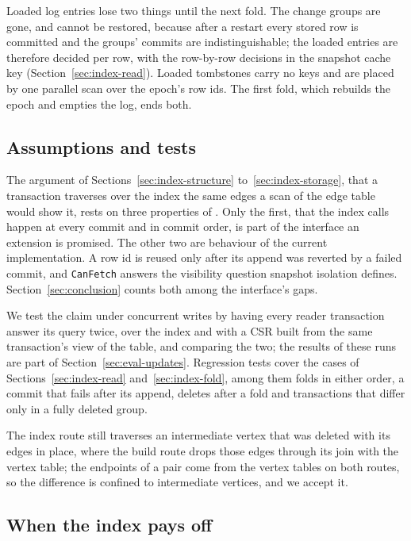Loaded log entries lose two things until the next fold. The change groups are gone, and cannot be restored, because
after a restart every stored row is committed and the groups' commits are indistinguishable; the loaded entries are
therefore decided per row, with the row-by-row decisions in the snapshot cache key (Section~\ref{sec:index-read}).
Loaded tombstones carry no keys and are placed by one parallel scan over the epoch's row ids. The first fold, which
rebuilds the epoch and empties the log, ends both.

\subsection{Assumptions and tests}
\label{sec:index-correctness}

The argument of Sections~\ref{sec:index-structure} to~\ref{sec:index-storage}, that a transaction traverses over
the index the same edges a scan of the edge table would show it, rests on three properties of \duckdb. Only the first, that
the index calls happen at every commit and in commit order, is part of the interface an extension is promised. The other
two are behaviour of the current implementation. A row id is reused only after its append was reverted by a failed
commit, and \texttt{CanFetch} answers the visibility question snapshot isolation defines. Section~\ref{sec:conclusion} counts both among the interface's gaps.

We test the claim under concurrent writes by having every reader transaction answer its query twice, over the
index and with a CSR built from the same transaction's view of the table, and comparing the two; the results of these
runs are part of Section~\ref{sec:eval-updates}. Regression tests cover the cases of Sections~\ref{sec:index-read}
and~\ref{sec:index-fold}, among them folds in either order, a commit that fails after its append, deletes after a fold
and transactions that differ only in a fully deleted group.

The index route still traverses an intermediate vertex that was deleted with its edges in place, where the build
route drops those edges through its join with the vertex table; the endpoints of a pair come from the vertex tables on
both routes, so the difference is confined to intermediate vertices, and we accept it.

\subsection{When the index pays off}
\label{sec:index-when}

